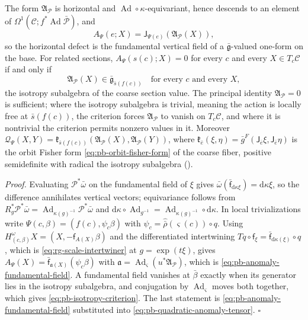 The form \(\mathfrak A_{\mathcal P}\) is horizontal and \(\operatorname{Ad}\circ\kappa\)-equivariant,
hence descends to an element of \(\Omega^1(\mathcal C;f^*\operatorname{Ad}\bar{\mathscr P})\), and
\begin{equation}
A_\Psi(e;X)
=\mathsf J_{\Psi(e)}\left(\mathfrak A_{\mathcal P}(X)\right),
\label{eq:pb-anomaly-fundamental-field}
\end{equation}
so the horizontal defect is the fundamental vertical field of a \(\bar{\mathfrak g}\)-valued one-form
on the base. For related sections, \(A_\Psi(s(c);X)=0\) for every \(c\) and every
\(X\in T_c\mathcal C\) if and only if
\begin{equation}
\mathfrak A_{\mathcal P}(X)\in\bar{\mathfrak g}_{\bar s(f(c))}
\quad\text{for every }c\text{ and every }X,
\label{eq:pb-isotropy-criterion}
\end{equation}
the isotropy subalgebra of the coarse section value. The principal identity
\(\mathfrak A_{\mathcal P}=0\) is sufficient; where the isotropy subalgebra is trivial, meaning the
action is locally free at \(\bar s(f(c))\), the criterion forces \(\mathfrak A_{\mathcal P}\) to vanish on
\(T_c\mathcal C\), and where it is nontrivial the criterion permits nonzero values in it. Moreover
\(\mathcal Q_\Psi(X,Y)=\mathfrak k_{\bar s(f(c))}(\mathfrak A_{\mathcal P}(X),\mathfrak A_{\mathcal P}(Y))\),
where \(\mathfrak k_{\bar e}(\xi,\eta)=\bar g^F(\mathsf J_{\bar e}\xi,\mathsf J_{\bar e}\eta)\) is the
orbit Fisher form \eqref{eq:pb-orbit-fisher-form} of the coarse fiber, positive semidefinite with
radical the isotropy subalgebra (). 

\noindent\emph{Proof.}
Evaluating \(\mathcal P^*\bar\omega\) on the fundamental field of \(\xi\) gives
\(\bar\omega(\bar{\mathsf f}_{\mathrm d\kappa\xi})=\mathrm d\kappa\xi\), so the difference annihilates vertical
vectors; equivariance follows from
\(R_g^*\mathcal P^*\bar\omega=\operatorname{Ad}_{\kappa(g)^{-1}}\mathcal P^*\bar\omega\) and
\(\mathrm d\kappa\circ\operatorname{Ad}_{g^{-1}}=\operatorname{Ad}_{\kappa(g)^{-1}}\circ\mathrm d\kappa\).
In local trivializations write \(\Psi(c,\beta)=(f(c),\psi_c\beta)\) with
\(\psi_c=\widehat{\bar\rho}(\varsigma(c))\circ q\). Using \(H^\omega_{(c,\beta)}X=(X,-\mathsf f_{A(X)}\beta)\)
and the differentiated intertwining \(Tq\circ\mathsf f_\xi=\bar{\mathsf f}_{\mathrm d\kappa(\xi)}\circ q\), which is
\eqref{eq:rg-scale-intertwiner} at \(g=\exp(t\xi)\), gives
\(A_\Psi(X)=\bar{\mathsf f}_{\mathfrak a(X)}(\psi_c\beta)\) with
\(\mathfrak a=\operatorname{Ad}_\varsigma(u^*\mathfrak A_{\mathcal P})\), which is
\eqref{eq:pb-anomaly-fundamental-field}. A fundamental field vanishes at \(\bar\beta\) exactly when its
generator lies in the isotropy subalgebra, and conjugation by \(\operatorname{Ad}_\varsigma\) moves
both together, which gives \eqref{eq:pb-isotropy-criterion}. The last statement is
\eqref{eq:pb-anomaly-fundamental-field} substituted into \eqref{eq:pb-quadratic-anomaly-tensor}.
\hfill$\square$

